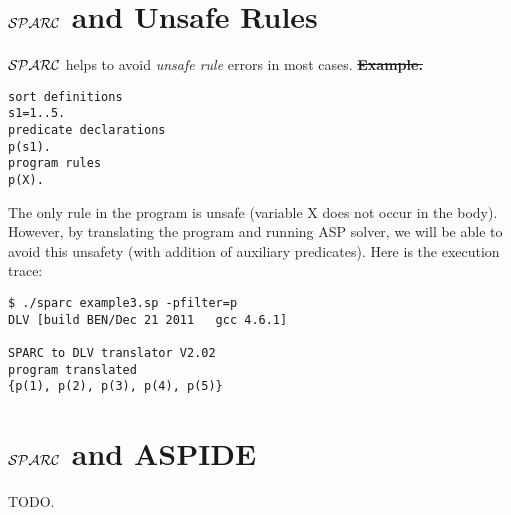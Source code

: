 \documentclass[12pt, letterpaper]{article}
\begin{document}
\section{${\cal SPARC}$ and Unsafe Rules}

${\cal SPARC}$ helps to avoid \textit{unsafe rule} errors in most  cases.
\st \textbf{Example.}
\begin{verbatim}
sort definitions
s1=1..5.
predicate declarations
p(s1).
program rules
p(X). 
\end{verbatim}
The only rule in the program is unsafe (variable X does not occur in the body).
However, by translating the program and running ASP solver, we will be able to avoid this unsafety 
(with addition of auxiliary predicates).
Here is the execution trace:
\begin{verbatim}
$ ./sparc example3.sp -pfilter=p 
DLV [build BEN/Dec 21 2011   gcc 4.6.1]

SPARC to DLV translator V2.02
program translated
{p(1), p(2), p(3), p(4), p(5)}
\end{verbatim}
\section{${\cal SPARC}$ and ASPIDE}
TODO. 


\end{document}
